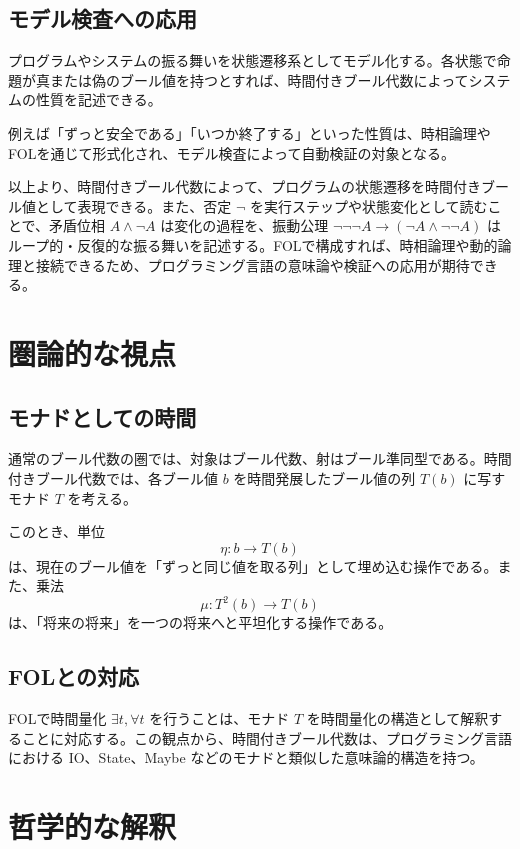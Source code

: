 \documentclass[10pt]{ltjsarticle}
\begin{document}
\subsection{モデル検査への応用}

プログラムやシステムの振る舞いを状態遷移系としてモデル化する。各状態で命題が真または偽のブール値を持つとすれば、時間付きブール代数によってシステムの性質を記述できる。

例えば「ずっと安全である」「いつか終了する」といった性質は、時相論理やFOLを通じて形式化され、モデル検査によって自動検証の対象となる。

以上より、時間付きブール代数によって、プログラムの状態遷移を時間付きブール値として表現できる。また、否定 $\neg$ を実行ステップや状態変化として読むことで、矛盾位相 $A \land \neg A$ は変化の過程を、振動公理 $\neg\neg\neg A \to (\neg A \land \neg\neg A)$ はループ的・反復的な振る舞いを記述する。FOLで構成すれば、時相論理や動的論理と接続できるため、プログラミング言語の意味論や検証への応用が期待できる。

\section{圏論的な視点}

\subsection{モナドとしての時間}

通常のブール代数の圏では、対象はブール代数、射はブール準同型である。時間付きブール代数では、各ブール値 $b$ を時間発展したブール値の列 $T(b)$ に写すモナド $T$ を考える。

このとき、単位
\[
  \eta : b \to T(b)
\]
は、現在のブール値を「ずっと同じ値を取る列」として埋め込む操作である。また、乗法
\[
  \mu : T^2(b) \to T(b)
\]
は、「将来の将来」を一つの将来へと平坦化する操作である。

\subsection{FOLとの対応}

FOLで時間量化 $\exists t, \forall t$ を行うことは、モナド $T$ を時間量化の構造として解釈することに対応する。この観点から、時間付きブール代数は、プログラミング言語における IO、State、Maybe などのモナドと類似した意味論的構造を持つ。

\section{哲学的な解釈}
\end{document}
